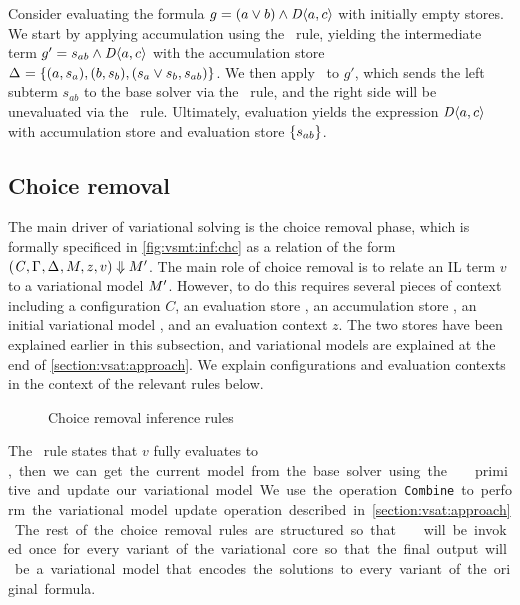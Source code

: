 Consider evaluating the formula $g=(a\vee b)\wedge\chc[D]{a,c}$ with initially
empty stores. We start by applying accumulation using the \evAcc\ rule,
yielding the intermediate term $g'=s_{ab}\wedge\chc[D]{a,c}$ with the
accumulation store $\aStore{}=\set{(a,s_a),(b,s_b),(s_a \vee s_b,s_{ab})}$. We
then apply \evAndL\ to $g'$, which sends the left subterm $s_{ab}$ to the base
solver via the \evSym\ rule, and the right side will be unevaluated via the
\evChc\ rule.
%
Ultimately, evaluation yields the expression $\chc[D]{a,c}$ with accumulation
store \aStore{} and evaluation store $\set{s_{ab}}$.


\subsection{Choice removal}
%
The main driver of variational solving is the choice removal phase, which is
formally specificed in \autoref{fig:vsmt:inf:chc} as a relation of the form
$(\mathit{C}{},\Gamma_{},\Delta_{},M_{},z,v)\Downarrow M_{}'$.
%
The main role of choice removal is to relate an IL term $v$ to a variational
model $M_{}'$. However, to do this requires several pieces of context
including a configuration $C$, an evaluation store \eStore{}, an accumulation
store \aStore{}, an initial variational model \vmodel{}, and an evaluation
context $z$. The two stores have been explained earlier in this subsection, and
variational models are explained at the end of \autoref{section:vsat:approach}. We
explain configurations and evaluation contexts in the context of the relevant
rules below.


\begin{figure}
  
  \caption{Choice removal inference rules}%
  \label{fig:vsmt:inf:chc}
\end{figure}


The \crEval\ rule states that $v$ fully evaluates to \unit, then we can get the
current model from the base solver using the \pmodel\ primitive and update our
variational model. We use the operation \texttt{Combine} to perform the
variational model update operation described in \autoref{section:vsat:approach}.
%
The rest of the choice removal rules are structured so that \crEval\ will be
invoked once for every variant of the variational core so that the final output
will be a variational model that encodes the solutions to every variant of the
original formula.


